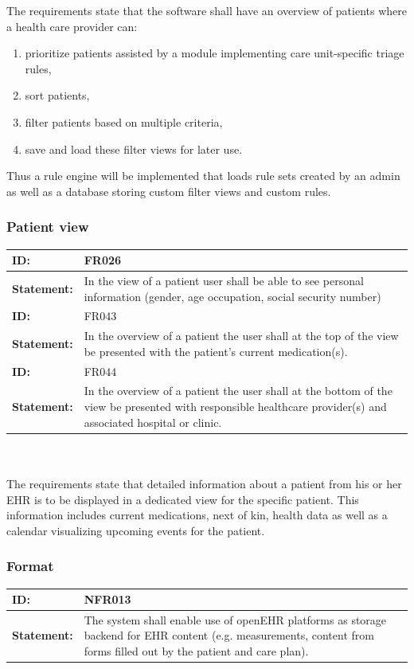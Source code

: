 \documentclass{article}
\begin{document}
The requirements state that the software shall have an overview of patients where a health care provider can:
\begin{enumerate}[label=(\roman*)]
\item prioritize patients assisted by a module implementing care unit-specific triage rules,
\item sort patients,
\item filter patients based on multiple criteria,
\item save and load these filter views for later use.
\end{enumerate}
Thus a rule engine will be implemented that loads rule sets created by an admin as well as a database storing custom filter views and custom rules.


\subsubsection{Patient view}

\begin{tabularx}{\linewidth}{| l | X |}
 \hline
 \textbf{ID:} & FR026  \\ 
 \hline
 \textbf{Statement:} & In the view of a patient user shall be able to see personal information (gender, age occupation, social security number) 
 \\ 

 \hline
 \textbf{ID:} & FR043  \\ 
 \hline
 \textbf{Statement:} & In the overview of a patient the user shall at the top of the view be presented with the patient’s current medication(s).
 \\ 
 \hline

 \hline
 \textbf{ID:} & FR044  \\ 
 \hline
 \textbf{Statement:} & In the overview of a patient the user shall at the bottom of the view be presented with responsible healthcare provider(s) and associated hospital or clinic.
 \\ 
 \hline
\end{tabularx}
\\ \\

The requirements state that detailed information about a patient from his or her EHR is to be displayed in a dedicated view for the specific patient. This information includes current medications, next of kin, health data as well as a calendar visualizing upcoming events for the patient.

\subsubsection{Format}
\begin{tabularx}{\linewidth}{| l | X |}
 \hline
 \textbf{ID:} & NFR013  \\ 
 \hline
 \textbf{Statement:} & The system shall enable use of openEHR platforms as storage backend for EHR content (e.g. measurements, content from forms filled out by the patient and care plan).
 \\ 
 \hline
\end{tabularx}
\\ \\
\end{document}
